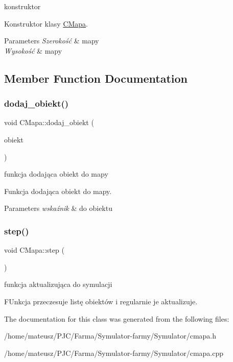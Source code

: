 konstruktor 

Konstruktor klasy \mbox{\hyperlink{class_c_mapa}{C\+Mapa}}.


\begin{DoxyParams}{Parameters}
{\em Szerokość} & mapy \\
\hline
{\em Wysokość} & mapy \\
\hline
\end{DoxyParams}


\subsection{Member Function Documentation}
\mbox{\label{class_c_mapa_a52368cb5130167cf5a610b2d539a2fad}} 
\subsubsection{\texorpdfstring{dodaj\+\_\+obiekt()}{dodaj\_obiekt()}}
{\footnotesize\ttfamily void C\+Mapa\+::dodaj\+\_\+obiekt (\begin{DoxyParamCaption}\item[{\mbox{\hyperlink{class_c_obiekt}{C\+Obiekt}} $\ast$}]{obiekt }\end{DoxyParamCaption})}



funkcja dodająca obiekt do mapy 

Funkcja dodająca obiekt do mapy.


\begin{DoxyParams}{Parameters}
{\em wskaźnik} & do obiektu \\
\hline
\end{DoxyParams}
\mbox{\label{class_c_mapa_acbaf866a435bd4049da8d9432a482c61}} 
\subsubsection{\texorpdfstring{step()}{step()}}
{\footnotesize\ttfamily void C\+Mapa\+::step (\begin{DoxyParamCaption}{ }\end{DoxyParamCaption})}



funkcja aktualizująca do symulacji 

F\+Unkcja przeczesuje listę obiektów i regularnie je aktualizuje. 

The documentation for this class was generated from the following files\+:\begin{DoxyCompactItemize}
\item 
/home/mateusz/\+P\+J\+C/\+Farma/\+Symulator-\/farmy/\+Symulator/cmapa.\+h\item 
/home/mateusz/\+P\+J\+C/\+Farma/\+Symulator-\/farmy/\+Symulator/cmapa.\+cpp\end{DoxyCompactItemize}

